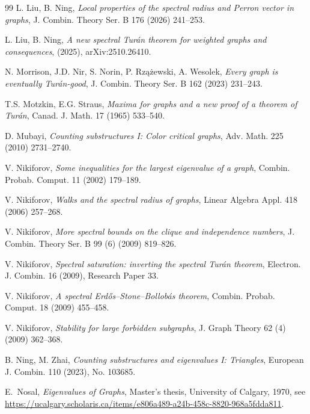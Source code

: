 \documentclass[11pt, a4paper]{article}
\theoremstyle{definition}
\theoremstyle{plain}
\begin{document}
\begin{thebibliography}{99}
L. Liu, B. Ning,
\emph{Local properties of the spectral radius and Perron vector in graphs},
{J. Combin. Theory Ser. B}  {176} (2026) 241--253.

L. Liu, B. Ning,
\emph{A new spectral Tur\'an theorem for weighted graphs and consequences}, (2025), 
arXiv:2510.26410.

N. Morrison, J.D. Nir, S. Norin, P. Rz\k{a}\.zewski, 
A. Wesolek,
\emph{Every graph is eventually Tur\'an-good},
{J. Combin. Theory Ser. B} 162 (2023) 231--243. 

T.S. Motzkin, E.G. Straus,
\emph{Maxima for graphs and a new proof of a theorem of Tur\'an},
{Canad. J. Math.}  {17} (1965) 533--540.

D. Mubayi,
\emph{Counting substructures I: Color critical graphs},
Adv. Math. 225 (2010) 2731--2740.

V. Nikiforov,
\emph{Some inequalities for the largest eigenvalue of a graph},
{Combin. Probab. Comput.}  {11} (2002)  179--189.

V. Nikiforov,
\emph{Walks and the spectral radius of graphs},
{Linear Algebra Appl.}  {418} (2006)  257--268.

V. Nikiforov, 
\emph{More spectral bounds on the clique and independence numbers}, 
J. Combin. Theory Ser. B 99 (6) (2009) 819--826. 

V. Nikiforov,
\emph{Spectral saturation: inverting the spectral Tur\'an theorem},
{Electron. J. Combin.}  {16} (2009), Research Paper 33.

V. Nikiforov,
\emph{A spectral Erd\H{o}s--Stone--Bollob\'as theorem},
{Combin. Probab. Comput.}  {18} (2009) 
455--458.

V. Nikiforov, 
\emph{Stability for large forbidden subgraphs},  
J. Graph Theory 62  (4) (2009)  362--368.  


B. Ning, M. Zhai,
\emph{Counting substructures and eigenvalues I: Triangles},
{European J. Combin.} 110 (2023), No. 103685. 

E.~Nosal,
\emph{Eigenvalues of Graphs},
Master's thesis, University of Calgary, 1970, 
see \url{https://ucalgary.scholaris.ca/items/e806a489-a24b-458c-8820-968a5fdda811}. 



\end{thebibliography}
\end{document}
